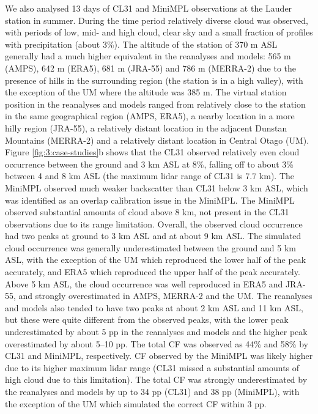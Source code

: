 We also analysed 13 days of CL31 and MiniMPL observations at the Lauder station
in summer. During the time period relatively diverse cloud was observed,
with periods of low, mid- and high cloud, clear sky and a small fraction
of profiles with precipitation (about 3\%). The altitude of the station of 370 m
ASL generally had a much higher equivalent in the reanalyses and models:
565 m (AMPS), 642 m (ERA5), 681 m (JRA-55) and 786 m (MERRA-2) due to the
presence of hills in the surrounding region (the station is in a high valley),
with the exception of the UM where the altitude was 385 m. The virtual station position in the
reanalyses and models ranged from relatively close to the station in the same
geographical region (AMPS, ERA5), a nearby location in a more hilly region
(JRA-55), a relatively distant location in the adjacent Dunstan Mountains
(MERRA-2) and a relatively distant location in Central Otago (UM).
Figure \ref{fig:3:case-studies}b shows that the CL31 observed relatively even cloud occurrence between the ground
and 3 km ASL at 8\%, falling off to about 3\% between 4 and 8 km ASL
(the maximum lidar range of CL31 is 7.7 km). The MiniMPL observed much weaker
backscatter than CL31 below 3 km ASL, which was identified as an overlap
calibration issue in the MiniMPL.
The MiniMPL observed
substantial amounts of cloud above 8 km, not present in the CL31 observations
due to its range limitation. Overall, the observed cloud occurrence had two
peaks at ground to 3 km ASL and at about 9 km ASL. The simulated cloud
occurrence was generally underestimated between the ground and 5 km ASL,
with the exception of the UM which reproduced the lower half of the peak
accurately, and ERA5 which reproduced the upper half of the peak accurately.
Above 5 km ASL, the cloud occurrence was well reproduced in ERA5 and JRA-55,
and strongly overestimated in AMPS, MERRA-2 and the UM. The reanalyses and models also
tended to have two peaks at about 2 km ASL and 11 km ASL, but these were quite
different from the observed peaks, with the lower peak underestimated by about
5 pp in the reanalyses and models and the higher peak overestimated by about 5--10 pp.
The total CF was observed as 44\% and 58\% by CL31 and MiniMPL, respectively.
CF observed by the MiniMPL was likely higher due to its higher maximum lidar range
(CL31 missed a substantial amounts of high cloud due to this limitation).
The total CF was strongly underestimated by the reanalyses and models
by up to 34 pp (CL31) and 38 pp (MiniMPL), with the exception of the UM
which simulated the correct CF within 3 pp.

